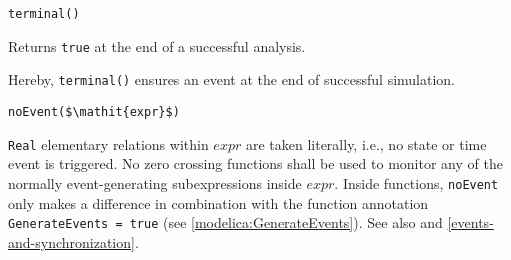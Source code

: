 \begin{operatordefinition}[terminal]
\begin{synopsis}\begin{lstlisting}
terminal()
\end{lstlisting}\end{synopsis}
\begin{semantics}
Returns \lstinline!true! at the end of a successful analysis.
\begin{nonnormative}
Hereby, \lstinline!terminal()! ensures an event at the end of successful simulation.
\end{nonnormative}
\end{semantics}
\end{operatordefinition}

\begin{operatordefinition}[noEvent]
\begin{synopsis}\begin{lstlisting}
noEvent($\mathit{expr}$)
\end{lstlisting}\end{synopsis}
\begin{semantics}
\lstinline!Real! elementary relations within $\mathit{expr}$ are taken literally, i.e., no state or time event is triggered.
No zero crossing functions shall be used to monitor any of the normally event-generating subexpressions inside $\mathit{expr}$.
Inside functions, \lstinline!noEvent! only makes a difference in combination with the function annotation \lstinline!GenerateEvents = true! (see \cref{modelica:GenerateEvents}).
See also  and \cref{events-and-synchronization}.
\end{semantics}
\end{operatordefinition}

